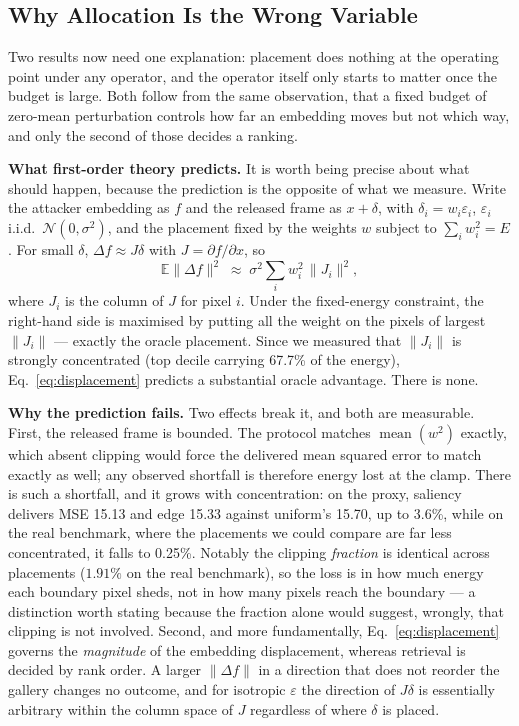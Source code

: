 \documentclass[10pt,journal]{IEEEtran}
\begin{document}
\subsection{Why Allocation Is the Wrong Variable}
\label{sec:mechanism}

Two results now need one explanation: placement does nothing at the operating
point under any operator, and the operator itself only starts to matter once
the budget is large. Both follow from the same observation, that a fixed
budget of zero-mean perturbation controls how far an embedding moves but not
which way, and only the second of those decides a ranking.

\textbf{What first-order theory predicts.} It is worth being precise about
what should happen, because the prediction is the opposite of what we
measure. Write the attacker embedding as $f$ and the released frame as
$x+\delta$, with $\delta_i = w_i\varepsilon_i$, $\varepsilon_i$ i.i.d.\
$\mathcal{N}(0,\sigma^2)$, and the placement fixed by the weights $w$ subject
to $\sum_i w_i^2 = E$. For small $\delta$, $\Delta f \approx J\delta$ with
$J=\partial f/\partial x$, so
\begin{equation}
\label{eq:displacement}
\mathbb{E}\lVert \Delta f\rVert^2 \;\approx\; \sigma^2 \sum_i w_i^2\,\lVert J_i\rVert^2 ,
\end{equation}
where $J_i$ is the column of $J$ for pixel $i$. Under the fixed-energy
constraint, the right-hand side is maximised by putting all the weight on the
pixels of largest $\lVert J_i\rVert$ --- exactly the oracle placement. Since
we measured that $\lVert J_i\rVert$ is strongly concentrated (top decile
carrying 67.7\% of the energy), Eq.~\eqref{eq:displacement} predicts a
substantial oracle advantage. There is none.

\textbf{Why the prediction fails.} Two effects break it, and both are
measurable. First, the released frame is bounded. The protocol matches
$\operatorname{mean}(w^2)$ exactly, which absent clipping would force the
delivered mean squared error to match exactly as well; any observed shortfall
is therefore energy lost at the clamp. There is such a shortfall, and it grows
with concentration: on the proxy, saliency delivers MSE 15.13 and edge 15.33
against uniform's 15.70, up to 3.6\%, while on the real benchmark, where the
placements we could compare are far less concentrated, it falls to 0.25\%.
Notably the clipping \emph{fraction} is identical across placements
($1.91\%$ on the real benchmark), so the loss is in how much energy each
boundary pixel sheds, not in how many pixels reach the boundary --- a
distinction worth stating because the fraction alone would suggest, wrongly,
that clipping is not involved. Second, and more fundamentally,
Eq.~\eqref{eq:displacement} governs the \emph{magnitude} of the embedding
displacement, whereas retrieval is decided by rank order. A larger
$\lVert\Delta f\rVert$ in a direction that does not reorder the gallery
changes no outcome, and for isotropic $\varepsilon$ the direction of
$J\delta$ is essentially arbitrary within the column space of $J$ regardless
of where $\delta$ is placed.
\end{document}
